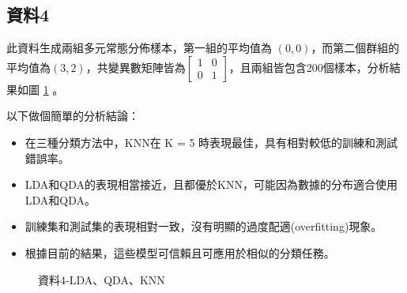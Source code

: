 \documentclass[12pt, a4paper]{article}
\begin{document}
\subsection{資料4}
此資料生成兩組多元常態分佈樣本，第一組的平均值為 $(0, 0)$，而第二個群組的平均值為$(3, 2)$，共變異數矩陣皆為$\begin{bmatrix}1 & 0 \\0 & 1 \end{bmatrix}$，且兩組皆包含200個樣本，分析結果如圖 \ref{fig:la4-LDAQDAKNN} 。

以下做個簡單的分析結論：
\begin{itemize}
\item 在三種分類方法中，KNN在 K = 5 時表現最佳，具有相對較低的訓練和測試錯誤率。
\item LDA和QDA的表現相當接近，且都優於KNN，可能因為數據的分布適合使用LDA和QDA。
\item 訓練集和測試集的表現相對一致，沒有明顯的過度配適(overfitting)現象。
\item 根據目前的結果，這些模型可信賴且可應用於相似的分類任務。
\end{itemize}
\begin{table} [H]
\centering
    \caption{資料4之LDA、QDA、KNN錯判率}\label{tb:la4-LDAQDAKNN}
    \renewcommand\arraystretch{1.5}
\end{table}
\vspace{30pt}
\begin{figure}[H]
    \caption{資料4-LDA、QDA、KNN}
    \label{fig:la4-LDAQDAKNN}
\end{figure}
\end{document}
